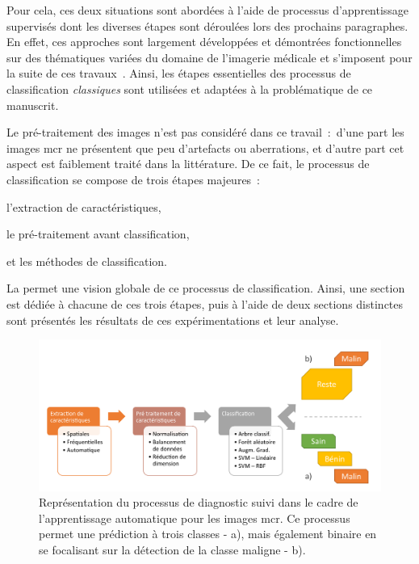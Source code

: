 Pour cela, ces deux situations sont abordées à l'aide de processus d'apprentissage supervisés dont les diverses étapes sont déroulées lors des prochains paragraphes. En effet, ces approches sont largement développées et démontrées fonctionnelles sur des thématiques variées du domaine de l'imagerie médicale et s'imposent pour la suite de ces travaux~\cite{Litjens2017,Pathan2018}. Ainsi, les étapes essentielles des processus de classification \textit{classiques} sont utilisées et adaptées à la problématique de ce manuscrit.\par

Le pré-traitement des images n'est pas considéré dans ce travail~:~d'une part les images \gls{mcr} ne présentent que peu d'artefacts ou aberrations, et d'autre part cet aspect est faiblement traité dans la littérature. De ce fait, le processus de classification se compose de trois étapes majeures~:
\begin{inlinerate}
    \item l'extraction de caractéristiques,
    \item le pré-traitement avant classification,
    \item et les méthodes de classification.
\end{inlinerate} La  permet une vision globale de ce processus de classification. Ainsi, une section est dédiée à chacune de ces trois étapes, puis à l'aide de deux sections distinctes sont présentés les résultats de ces expérimentations et leur analyse.\par

\begin{figure}[H]
\centering
    \includegraphics[width=\linewidth]{contents/chapter_5/resources/scheme_macro_image_classification.pdf}
    \caption{Représentation du processus de diagnostic suivi dans le cadre de l'apprentissage automatique pour les images \gls{mcr}. Ce processus permet une prédiction à trois classes - a), mais également binaire en se focalisant sur la détection de la classe maligne - b).}
    \label{fig:scheme_macro_image_classification}
\end{figure}\par

